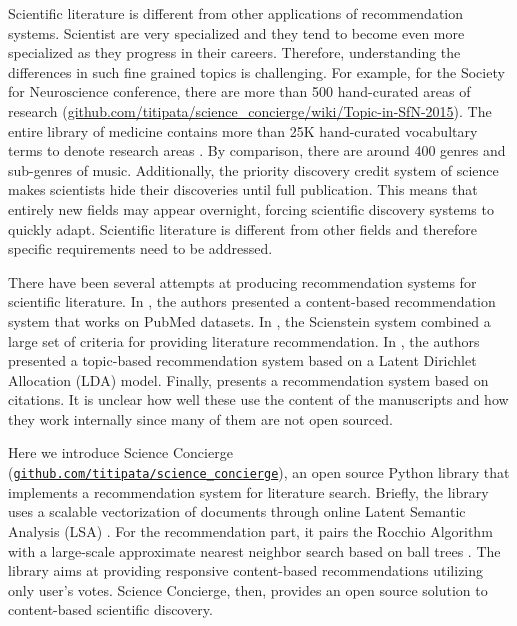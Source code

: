 \documentclass[a4paper]{article}
\begin{document}
Scientific literature is different from other applications of recommendation systems.
Scientist are very specialized and they tend to become even more specialized
as they progress in their careers. Therefore, understanding the differences in such
fine grained topics is challenging. For example, for the Society for Neuroscience
conference, there are more than 500 hand-curated areas of research (\url{github.com/titipata/science_concierge/wiki/Topic-in-SfN-2015}). The entire
library of medicine contains more than 25K hand-curated vocabultary terms to denote research areas \cite{lipscomb2000medical}. By comparison, there are around 400 genres and sub-genres of music.
Additionally, the priority discovery credit system of science makes scientists hide their discoveries until full publication.
This means that entirely new fields may appear overnight, forcing scientific discovery systems
to quickly adapt. Scientific literature is different from other fields and therefore
specific requirements need to be addressed.


There have been several attempts at producing recommendation systems for scientific literature.
In \cite{yoneya2007pure}, the authors presented a content-based recommendation system that works on PubMed datasets. In \cite{gipp2009scienstein}, the Scienstein system combined a large set of criteria for providing literature recommendation. In \cite{wang2011collaborative}, the authors presented a topic-based recommendation system based on a Latent Dirichlet Allocation (LDA) model. Finally, \cite{wesley2016babel} presents a recommendation system based on citations. It is unclear how well these use the content of the
manuscripts and how they work internally since many of them are not open sourced.


Here we introduce Science Concierge (\href{https://github.com/titipata/science_concierge}{\texttt{github.com/titipata/science\_concierge}}), an open source Python library that implements a recommendation system for literature search. Briefly, the library uses a scalable vectorization of documents through online Latent Semantic Analysis (LSA) \cite{manning2008introduction}. For the recommendation part, it pairs the Rocchio Algorithm \cite{rocchio1971relevance} with a large-scale approximate nearest neighbor search based on ball trees \cite{shakhnarovish2005indyk}. The library aims at providing responsive content-based recommendations utilizing only user’s votes. Science Concierge, then, provides an open source solution to content-based scientific discovery.
\end{document}
